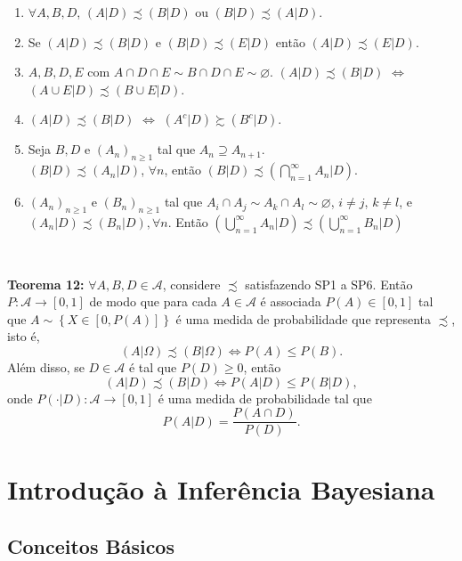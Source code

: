 \documentclass[
]{book}
\begin{document}
\begin{enumerate}
\def\labelenumi{\arabic{enumi}.}
\item
  \(\forall A,B,D\), \((A|D) \precsim (B|D)\) ou \((B|D) \precsim (A|D)\).
\item
  Se \((A|D) \precsim (B|D)\) e \((B|D) \precsim (E|D)\) então \((A|D) \precsim (E|D)\).
\item
  \(A,B,D,E\) com \(A \cap D \cap E \sim B \cap D \cap E \sim \varnothing\). \newline \((A|D) \precsim (B|D)\) \(\Leftrightarrow\) \((A \cup E|D) \precsim (B \cup E|D)\).
\item
  \((A|D) \precsim (B|D)\) \(\Leftrightarrow\) \((A^c|D) \succsim (B^c|D)\).
\item
  Seja \(B, D\) e \((A_n)_{n \geq 1}\) tal que \(A_n \supseteq A_{n+1}\).\\
  \((B|D) \precsim (A_n|D)\), \(\forall n\), então \(\displaystyle (B|D) \precsim \left(\bigcap_{n=1}^{\infty} A_n|D\right)\).
\item
  \((A_n)_{n \geq 1}\) e \((B_n)_{n \geq 1}\) tal que \(A_i \cap A_j \sim A_k \cap A_l \sim \varnothing\), \(i \neq j\), \(k \neq l\), e \((A_n|D) \precsim (B_n|D), \forall n\). Então \(\displaystyle \left(\bigcup_{n=1}^{\infty} A_n | D \right) \precsim \left(\bigcup_{n=1}^{\infty} B_n | D \right)\)
\end{enumerate}

\(~\)

\textbf{Teorema 12:} \(\forall A, B, D \in \mathcal{A}\), considere \(\precsim\) satisfazendo SP1 a SP6. Então \(P: \mathcal{A} \rightarrow [0,1]\) de modo que para cada \(A \in \mathcal{A}\) é associada \(P(A) \in [0,1]\) tal que \(A \sim \left\{X \in \left[0,P(A)\right]\right\}\) é uma medida de probabilidade que representa \(\precsim\), isto é, \[(A|\Omega) \precsim (B|\Omega) \Leftrightarrow P(A) \leq P(B).\] Além disso, se \(D \in \mathcal{A}\) é tal que \(P(D) \geq 0\), então \[(A|D) \precsim (B|D) \Leftrightarrow P(A|D) \leq P(B|D),\] onde \(P(\cdot|D): \mathcal{A} \rightarrow [0,1]\) é uma medida de probabilidade tal que
\[P(A|D) = \frac{P(A \cap D)}{P(D)}.\]

\hypertarget{Bayes}{%
\chapter{Introdução à Inferência Bayesiana}\label{Bayes}}

\hypertarget{BasBayes}{%
\section{Conceitos Básicos}\label{BasBayes}}
\end{document}
